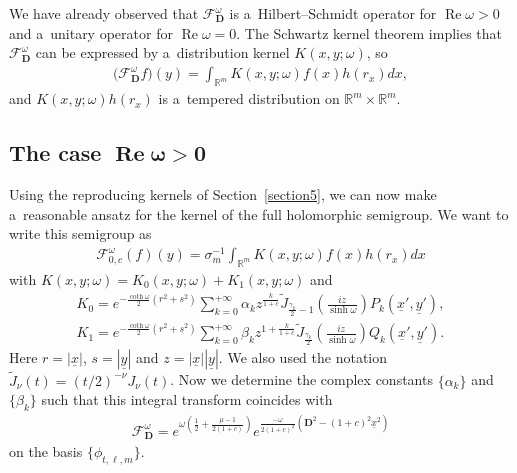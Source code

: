 \documentclass[pdftex]{sigma}
\numberwithin{equation}{section}
\numberwithin{theorem}{section}
\numberwithin{proposition}{section}
\numberwithin{lemma}{section}
\numberwithin{corollary}{section}
\numberwithin{definition}{section}
\numberwithin{example}{section}
\numberwithin{remark}{section}
\numberwithin{note}{section}
\theoremstyle{remark}
\newcommand{\mR}{\mathbb{R}}
\newcommand{\cF}{\mathcal{F}}
\newcommand{\dD}{\textbf{D}}
\newcommand{\ux}{\underline{x}}
\newcommand{\uy}{\underline{y}}
\def\o{{\omega}}
\begin{document}
We have already observed that $\cF_{\dD}^{\o}$ is a~Hilbert--Schmidt operator
for $\operatorname{Re}\o>0$ and a~unitary operator for $\operatorname{Re}\o=0$.
The Schwartz kernel theorem implies
that $\cF_{\dD}^{\o}$ can be expressed by a~distribution kernel
$K(x,y;\omega)$, so
\begin{gather*}
\big(\cF_{\dD}^{\o}f\big)(y)=\int_{\mR^m}K(x,y;\omega)f(x)h(r_{x})dx,
\end{gather*}
and $K(x,y;\omega)h(r_{x})$ is a~tempered distribution
on $\mR^m\times\mR^m$.

\subsection[The case $\operatorname{Re}\o>0$]{The case $\boldsymbol{\operatorname{Re}\o>0}$}

Using the reproducing kernels of Section~\ref{section5}, we can now make a~reasonable ansatz for
the kernel of the full holomorphic semigroup.
We want to write this semigroup as
\begin{gather*}
\cF_{0,c}^{\o}(f)(y)=\sigma_{m}^{-1}\int_{\mR^{m}}K(x,y;\omega)f(x)h(r_{x})dx
\end{gather*}
with $K(x,y;\omega)=K_{0}(x,y;\omega)+K_{1}(x,y;\omega)$ and
\begin{gather}
K_{0} = e^{-\frac{\coth{\o}}{2} (r^{2}+ s^{2})}\sum_{k=0}^{+\infty} \alpha_{k} z^{\frac{k}{1+c}}
\widetilde{J}_{\frac{\gamma_{k}}{2} -1}\left(\frac{iz}{\sinh{\o}}\right) P_{k}(\ux', \uy'),\nonumber\\
K_{1} = e^{-\frac{\coth{\o}}{2} (r^{2}+ s^{2})} \sum_{k=0}^{+\infty} \beta_{k} z^{1+\frac{k}{1+c}}
\widetilde{J}_{\frac{\gamma_{k}}{2}}\left(\frac{iz}{\sinh{\o}}\right) Q_{k}(\ux', \uy').\label{seriessemigroup}
\end{gather}
Here $r=|\ux|$, $s=|\uy|$ and $z=|\ux||\uy|$.
We also used the notation $\widetilde{J}_{\nu}(t)=(t/2)^{-\nu}J_{\nu}(t)$.
Now we determine the complex constants $\{\alpha_{k}\}$ and $\{\beta_{k}\}$ such that this
integral transform coincides with
\begin{gather*}
\cF_{\dD}^{\o}=e^{\o\left(\frac{1}{2}+\frac{\mu-1}{2(1+c)}\right)}e^{\frac{-\o}{
2(1+c)^{2}}\left(\dD^{2}-(1+c)^{2}\ux^{2}\right)}
\end{gather*}
on the basis $\{\phi_{t,\ell,m}\}$.
\end{document}
